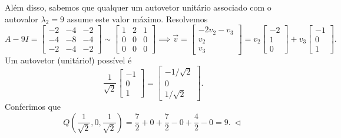 \begin{ex}
	Além disso, sabemos que qualquer um autovetor unitário associado com o autovalor $\lambda_2 = 9$ assume este valor máximo. Resolvemos
	\begin{equation}
	A - 9 I =
	\begin{bmatrix}
	-2 & -4 & -2 \\
	-4 & -8 & -4 \\
	-2 & -4 &  -2
	\end{bmatrix} \sim
	\begin{bmatrix}
	1 & 2 & 1 \\
	0 & 0 & 0 \\
	0 & 0 & 0
	\end{bmatrix} \implies \vec{v} =
	\begin{bmatrix}
	-2v_2 - v_3 \\ v_2 \\ v_3
	\end{bmatrix}  = v_2
	\begin{bmatrix}
	-2 \\ 1 \\ 0
	\end{bmatrix} + v_3
	\begin{bmatrix}
	-1 \\ 0 \\ 1
	\end{bmatrix}.
	\end{equation} Um autovetor (unitário!) possível é
	\begin{equation}
	\frac{1}{\sqrt{2}}
	\begin{bmatrix}
	-1 \\ 0 \\ 1
	\end{bmatrix} =
	\begin{bmatrix}
	-1/\sqrt{2} \\ 0 \\ 1/\sqrt{2}
	\end{bmatrix}.
	\end{equation} Conferimos que
	\begin{equation}
	Q \left(\frac{1}{\sqrt{2}}, 0, \frac{1}{\sqrt{2}}\right) = \frac{7}{2} + 0 + \frac{7}{2} - 0 + \frac{4}{2} - 0 = 9. \ \lhd
	\end{equation}
\end{ex}


